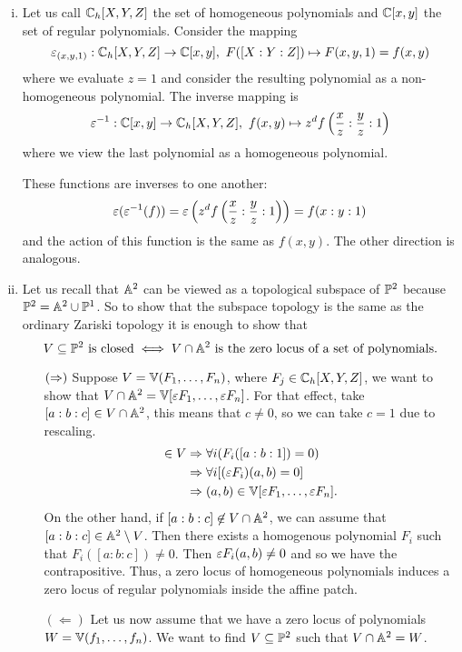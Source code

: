 \documentclass[12pt]{memoir}
\begin{document}
  \begin{ptcbr}
    \begin{enumerate}[i)]
      \itemsep=-0.4em 
      \item Let us call $\mathbb{C}_h[X,Y,Z]$ the set of homogeneous polynomials and $\mathbb{C}[x,y]$ the set of regular polynomials. Consider the mapping
      $$\eps_{(x,y,1)}:\bC_h[X,Y,Z]\to \bC[x,y],\ F([X:Y:Z])\mapsto F(x,y,1)=f(x,y)$$
      where we evaluate $z=1$ and consider the resulting polynomial as a non-homogeneous polynomial. The inverse mapping is 
      $$\varepsilon^{-1}:\mathbb{C}[x,y]\to\mathbb{C}_h[X,Y,Z],\ f(x,y)\mapsto z^df\left(\frac xz:\frac yz:1\right)$$
      where we view the last polynomial as a homogeneous polynomial.\par 
      These functions are inverses to one another:
      $$\varepsilon(\varepsilon^{-1}(f))=\varepsilon\left(z^df\left(\frac xz:\frac yz:1\right)\right)=f(x:y:1)$$
      and the action of this function is the same as $f(x,y)$. The other direction is analogous.
      \item Let us recall that $\mathbb{A}^2$ can be viewed as a topological subspace of $\mathbb{P}^2$ because $\mathbb{P}^2=\mathbb{A}^2\cup\mathbb{P}^1$. So to show that the subspace topology is the same as the ordinary Zariski topology it is enough to show that 
      $$V\subseteq\bP^2\ \text{is closed} \iff V\cap\bA^2\ \text{is the zero locus of a set of polynomials}.$$
      \begin{enumerate}
        \itemsep=-0.4em
        \item[$(\Rightarrow)$] Suppose $V=\mathbb{V}(F_1,\dots,F_n)$, where $F_j\in\mathbb{C}_h[X,Y,Z]$, we want to show that $V\cap \mathbb{A}^2=\mathbb{V}[\varepsilon F_1,\dots,\varepsilon F_n]$. For that effect, take $[a:b:c]\in V\cap\mathbb{A}^2$, this means that $c\neq 0$, so we can take $c=1$ due to rescaling.
        \begin{align*}
          [a:b:1]\in V&\To \forall i(F_i([a:b:1])=0)\\
          &\To\forall i[(\eps F_i)(a,b)=0]\\
          &\To (a,b)\in \bV[\eps F_1,\dots,\eps F_n].
        \end{align*}
        On the other hand, if $[a:b:c]\not\in V\cap\mathbb{A}^2$, we can assume that $[a:b:c]\in \mathbb{A}^2\setminus V$. Then there exists a homogenous polynomial $F_i$ such that $F_i([a:b:c])\neq 0$. Then $\varepsilon F_i (a,b)\neq 0$ and so we have the contrapositive. Thus, a zero locus of homogeneous polynomials induces a zero locus of regular polynomials inside the affine patch.
        \item[$(\Leftarrow)$] Let us now assume that we have a zero locus of polynomials $W=\mathbb{V}(f_1,\dots,f_n)$. We want to find $V\subseteq\mathbb{P}^2$ such that $V\cap\mathbb{A}^2=W$.\par 

\end{enumerate}
\end{enumerate}
\end{ptcbr}
\end{document}
